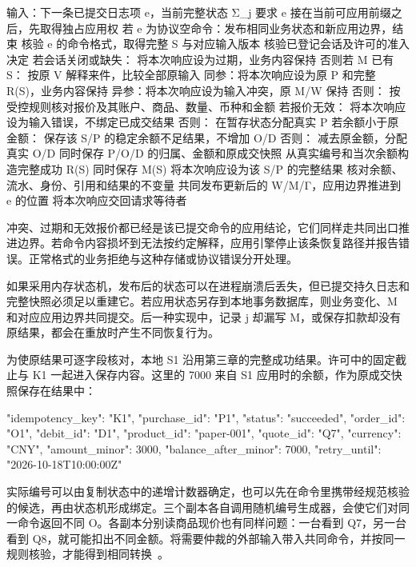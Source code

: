 \begin{BookCode}
输入：下一条已提交日志项 e，当前完整状态 Σ_j
要求 e 接在当前可应用前缀之后，先取得独占应用权
若 e 为协议空命令：发布相同业务状态和新应用边界，结束
核验 e 的命令格式，取得完整 S 与对应输入版本
核验已登记会话及许可的准入决定
若会话关闭或缺失：
    将本次响应设为过期，业务内容保持
否则若 M 已有 S：
    按原 V 解释来件，比较全部原输入
    同参：将本次响应设为原 P 和完整 R(S)，业务内容保持
    异参：将本次响应设为输入冲突，原 M/W 保持
否则：
    按受控规则核对报价及其账户、商品、数量、币种和金额
    若报价无效：
        将本次响应设为输入错误，不绑定已成交结果
    否则：
        在暂存状态分配真实 P
        若余额小于原金额：
            保存该 S/P 的稳定余额不足结果，不增加 O/D
        否则：
            减去原金额，分配真实 O/D
            同时保存 P/O/D 的归属、金额和原成交快照
            从真实编号和当次余额构造完整成功 R(S)
        同时保存 M(S)
        将本次响应设为该 S/P 的完整结果
核对余额、流水、身份、引用和结果的不变量
共同发布更新后的 W/M/Γ，应用边界推进到 e 的位置
将本次响应交回请求等待者
\end{BookCode}

冲突、过期和无效报价都已经是该已提交命令的应用结论，它们同样走共同出口推进边界。若命令内容损坏到无法按约定解释，应用引擎停止该条恢复路径并报告错误。正常格式的业务拒绝与这种存储或协议错误分开处理。

如果采用内存状态机，发布后的状态可以在进程崩溃后丢失，但已提交持久日志和完整快照必须足以重建它。若应用状态另存到本地事务数据库，则业务变化、M 和对应应用边界共同提交。后一种实现中，记录 j 却漏写 M，或保存扣款却没有原结果，都会在重放时产生不同恢复行为。

为使原结果可逐字段核对，本地 S1 沿用第三章的完整成功结果。许可中的固定截止与 K1 一起进入保存内容。这里的 7000 来自 S1 应用时的余额，作为原成交快照保存在结果中：

\begin{BookCode}
{
  "idempotency_key": "K1",
  "purchase_id": "P1",
  "status": "succeeded",
  "order_id": "O1",
  "debit_id": "D1",
  "product_id": "paper-001",
  "quote_id": "Q7",
  "currency": "CNY",
  "amount_minor": 3000,
  "balance_after_minor": 7000,
  "retry_until": "2026-10-18T10:00:00Z"
}
\end{BookCode}

实际编号可以由复制状态中的递增计数器确定，也可以先在命令里携带经规范核验的候选，再由状态机形成绑定。三个副本各自调用随机编号生成器，会使它们对同一命令返回不同 O。各副本分别读商品现价也有同样问题：一台看到 Q7，另一台看到 Q8，就可能扣出不同金额。将需要仲裁的外部输入带入共同命令，并按同一规则核验，才能得到相同转换~\cite{state-machine-approach}。

